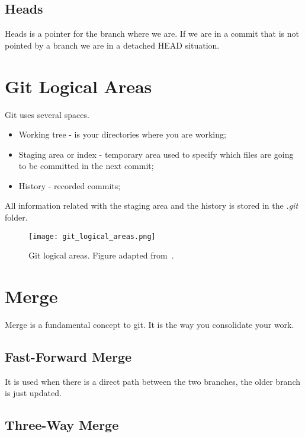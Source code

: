 \begin{refsection}
\subsection{Heads}

Heads is a pointer for the branch where we are.
If we are in a commit that is not pointed by a branch we are in a detached HEAD situation.

\section{Git Logical Areas}

Git uses several spaces.

\begin{itemize}
    \item[\textbullet] {Working tree - is your directories where you are working;}
    \item[\textbullet] {Staging area or index - temporary area used to specify which files are going to be committed in the next commit;}
    \item[\textbullet] {History - recorded commits;}
\end{itemize}

All information related with the staging area and the history is stored in the \emph{.git} folder.

\begin{figure}[h!]
  \centering
  \texttt{[image: git\_logical\_areas.png]}
  \caption{Git logical areas. Figure adapted from~\cite{Lodato19}.}\label{git_logical_areas}
\end{figure}

\section{Merge}

Merge is a fundamental concept to git. It is the way you consolidate your work.

\subsection{Fast-Forward Merge}

It is used when there is a direct path between the two branches, the older branch is just updated.

\subsection{Three-Way Merge}


\end{refsection}

